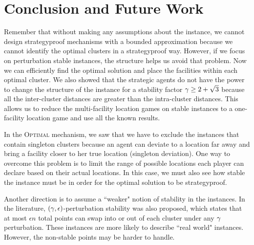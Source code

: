 \section{Conclusion and Future Work}
Remember that without making any assumptions about the instance, we cannot design strategyproof mechanisms with a bounded approximation because we cannot identify the optimal clusters in a strategyproof way. However, if we focus on perturbation stable instances, the structure helps us avoid that problem. Now we can efficiently find the optimal solution and place the facilities within each optimal cluster. We also showed that the strategic agents do not have the power to change the structure of the instance for a stability factor $\gamma\ge2+\sqrt{3}$ because all the inter-cluster distances are greater than the intra-cluster distances. This allows us to reduce the multi-facility location games on stable instances to a one-facility location game and use all the known results.

In the \textsc{Optimal} mechanism, we saw that we have to exclude the instances that contain singleton clusters because an agent can deviate to a location far away and bring a facility closer to her true location (singleton deviation). One way to overcome this problem is to limit the range of possible locations each player can declare based on their actual locations. In this case, we must also see how stable the instance must be in order for the optimal solution to be strategyproof.

Another direction is to assume a ``weaker" notion of stability in the instances. In the literature, $(\gamma,\epsilon)$-perturbation stability was also proposed, which states that at most $\epsilon n$ total points can swap into or out of each cluster under any $\gamma$ perturbation. These instances are more likely to describe ``real world"  instances. However, the non-stable points may be harder to handle.







